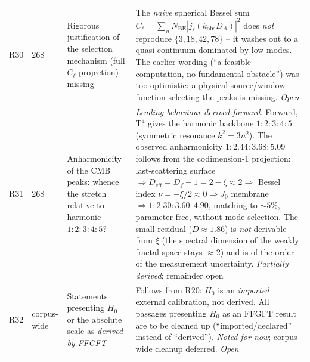 {\begin{longtable}{p{0.6cm}p{2.4cm}p{5.5cm}p{5.5cm}}
R30 & 268 &
  Rigorous justification of the selection mechanism (full $C_\ell$ projection) missing &
  The \emph{naive} spherical Bessel sum $C_\ell=\sum_n N_\mathrm{BE}|j_\ell(k_\mathrm{obs}D_A)|^2$ does \emph{not} reproduce $\{3,18,42,78\}$ -- it washes out to a quasi-continuum dominated by low modes. The earlier wording (``a feasible computation, no fundamental obstacle'') was too optimistic: a physical source/window function selecting the peaks is missing. \emph{Open} \\[3pt]
R31 & 268 &
  Anharmonicity of the CMB peaks: whence the stretch relative to harmonic $1:2:3:4:5$? &
  \emph{Leading behaviour derived forward.} Forward, T$^4$ gives the harmonic backbone $1:2:3:4:5$ (symmetric resonance $k^2=3n^2$). The observed anharmonicity $1:2.44:3.68:5.09$ follows from the codimension-1 projection: last-scattering surface $\Rightarrow D_\mathrm{eff}=D_f-1=2-\xi\approx2 \Rightarrow$ Bessel index $\nu=-\xi/2\approx0 \Rightarrow J_0$ membrane $\Rightarrow 1:2.30:3.60:4.90$, matching to $\sim5\%$, parameter-free, without mode selection. The small residual ($D\approx1.86$) is \emph{not} derivable from $\xi$ (the spectral dimension of the weakly fractal space stays $\approx2$) and is of the order of the measurement uncertainty. \emph{Partially derived}; remainder open \\[3pt]
R32 & corpus-wide &
  Statements presenting $H_0$ or the absolute scale as \emph{derived by FFGFT} &
  Follows from R20: $H_0$ is an \emph{imported} external calibration, not derived. All passages presenting $H_0$ as an FFGFT result are to be cleaned up (\enquote{imported/declared} instead of \enquote{derived}). \emph{Noted for now}; corpus-wide cleanup deferred. \emph{Open} \\
\end{longtable}
}
